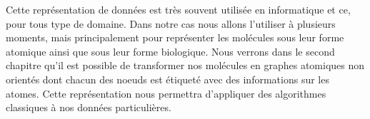 Cette représentation de données est très souvent utilisée en informatique et ce, pour tous type de domaine.
Dans notre cas nous allons l'utiliser à plusieurs moments, mais principalement pour représenter les molécules sous leur forme atomique ainsi que sous leur forme biologique.
Nous verrons dans le second chapitre qu'il est possible de transformer nos molécules en graphes atomiques non orientés dont chacun des noeuds est étiqueté avec des informations sur les atomes.
Cette représentation nous permettra d'appliquer des algorithmes classiques à nos données particulières.





























